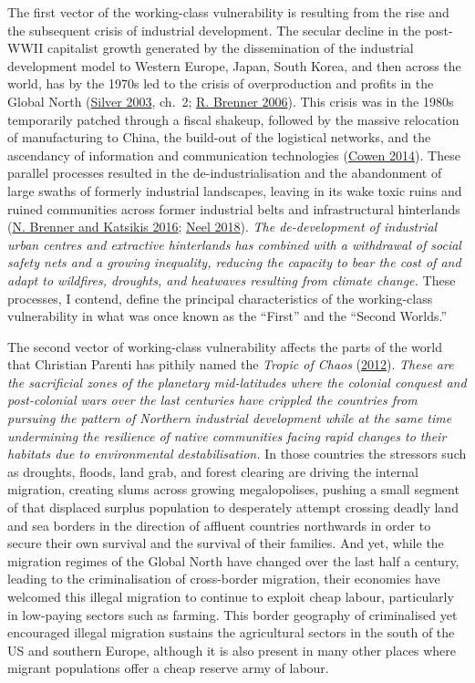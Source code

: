 \documentclass[a4paper, nobind]{templates/ociamthesis}
\begin{document}
The first vector of the working-class vulnerability is resulting from the rise and the subsequent crisis of industrial development. The secular decline in the post-WWII capitalist growth generated by the dissemination of the industrial development model to Western Europe, Japan, South Korea, and then across the world, has by the 1970s led to the crisis of overproduction and profits in the Global North (\protect\hyperlink{ref-silver_forces_2003}{Silver 2003}, ch.~2; \protect\hyperlink{ref-brenner_economics_2006}{R. Brenner 2006}). This crisis was in the 1980s temporarily patched through a fiscal shakeup, followed by the massive relocation of manufacturing to China, the build-out of the logistical networks, and the ascendancy of information and communication technologies (\protect\hyperlink{ref-cowen_deadly_2014}{Cowen 2014}). These parallel processes resulted in the de-industrialisation and the abandonment of large swaths of formerly industrial landscapes, leaving in its wake toxic ruins and ruined communities across former industrial belts and infrastructural hinterlands (\protect\hyperlink{ref-brenner_operational_2016}{N. Brenner and Katsikis 2016}; \protect\hyperlink{ref-neel_hinterland_2018}{Neel 2018}). \emph{The de-development of industrial urban centres and extractive hinterlands has combined with a withdrawal of social safety nets and a growing inequality, reducing the capacity to bear the cost of and adapt to wildfires, droughts, and heatwaves resulting from climate change.} These processes, I contend, define the principal characteristics of the working-class vulnerability in what was once known as the ``First'' and the ``Second Worlds.''

The second vector of working-class vulnerability affects the parts of the world that Christian Parenti has pithily named the \emph{Tropic of Chaos} (\protect\hyperlink{ref-parenti_tropic_2012}{2012}). \emph{These are the sacrificial zones of the planetary mid-latitudes where the colonial conquest and post-colonial wars over the last centuries have crippled the countries from pursuing the pattern of Northern industrial development while at the same time undermining the resilience of native communities facing rapid changes to their habitats due to environmental destabilisation.} In those countries the stressors such as droughts, floods, land grab, and forest clearing are driving the internal migration, creating slums across growing megalopolises, pushing a small segment of that displaced surplus population to desperately attempt crossing deadly land and sea borders in the direction of affluent countries northwards in order to secure their own survival and the survival of their families. And yet, while the migration regimes of the Global North have changed over the last half a century, leading to the criminalisation of cross-border migration, their economies have welcomed this illegal migration to continue to exploit cheap labour, particularly in low-paying sectors such as farming. This border geography of criminalised yet encouraged illegal migration sustains the agricultural sectors in the south of the US and southern Europe, although it is also present in many other places where migrant populations offer a cheap reserve army of labour.
\end{document}
